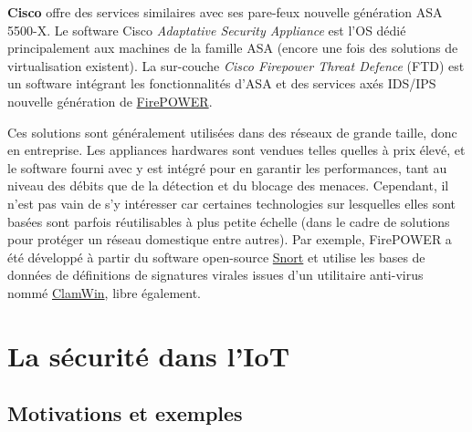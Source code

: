 \documentclass[]{article}
\begin{document}
\par \textbf{Cisco} offre des services similaires avec ses pare-feux nouvelle génération ASA 5500-X. Le software Cisco \textit{Adaptative Security Appliance} est l'OS dédié principalement aux machines de la famille ASA (encore une fois des solutions de virtualisation existent). La sur-couche \textit{Cisco Firepower Threat Defence} (FTD) est un software intégrant les fonctionnalités d'ASA et des services axés IDS/IPS nouvelle génération de \href{https://en.wikipedia.org/wiki/Sourcefire}{FirePOWER}.\\

\par Ces solutions sont généralement utilisées dans des réseaux de grande taille, donc en entreprise. Les appliances hardwares sont vendues telles quelles à prix élevé, et le software fourni avec y est intégré pour en garantir les performances, tant au niveau des débits que de la détection et du blocage des menaces. Cependant, il n'est pas vain de s'y intéresser car certaines technologies sur lesquelles elles sont basées sont parfois réutilisables à plus petite échelle (dans le cadre de solutions pour protéger un réseau domestique entre autres). Par exemple, FirePOWER a été développé à partir du software open-source \href{https://en.wikipedia.org/wiki/Snort_(software)}{Snort} et utilise les bases de données de définitions de signatures virales issues d'un utilitaire anti-virus nommé \href{http://www.clamwin.com/content/view/58/27/}{ClamWin}, libre également.

\newpage


\section{La sécurité dans l'IoT}\label{prot_IoT}

\subsection{Motivations et exemples}\label{motiv_IoT}
\end{document}
